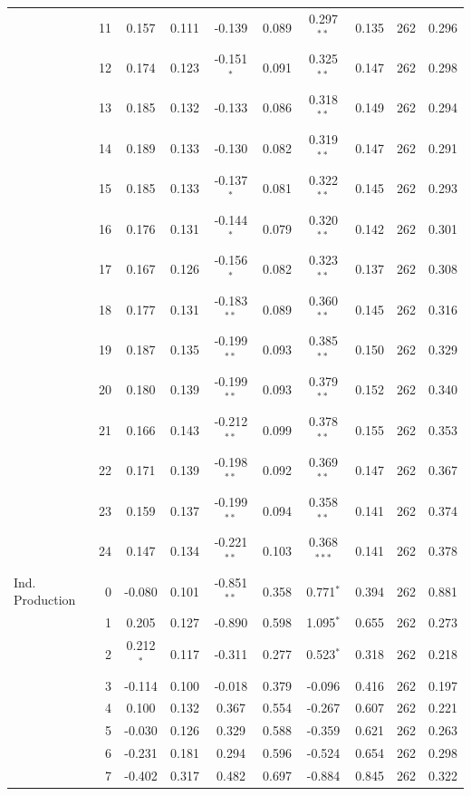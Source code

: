 \begin{longtable}[t]{lrcccccccc}
 & 11 & 0.157 & 0.111 & -0.139 & 0.089 & 0.297$^{**}$ & 0.135 & 262 & 0.296\\
 & 12 & 0.174 & 0.123 & -0.151$^{*}$ & 0.091 & 0.325$^{**}$ & 0.147 & 262 & 0.298\\
 & 13 & 0.185 & 0.132 & -0.133 & 0.086 & 0.318$^{**}$ & 0.149 & 262 & 0.294\\
 & 14 & 0.189 & 0.133 & -0.130 & 0.082 & 0.319$^{**}$ & 0.147 & 262 & 0.291\\
 & 15 & 0.185 & 0.133 & -0.137$^{*}$ & 0.081 & 0.322$^{**}$ & 0.145 & 262 & 0.293\\
 & 16 & 0.176 & 0.131 & -0.144$^{*}$ & 0.079 & 0.320$^{**}$ & 0.142 & 262 & 0.301\\
 & 17 & 0.167 & 0.126 & -0.156$^{*}$ & 0.082 & 0.323$^{**}$ & 0.137 & 262 & 0.308\\
 & 18 & 0.177 & 0.131 & -0.183$^{**}$ & 0.089 & 0.360$^{**}$ & 0.145 & 262 & 0.316\\
 & 19 & 0.187 & 0.135 & -0.199$^{**}$ & 0.093 & 0.385$^{**}$ & 0.150 & 262 & 0.329\\
 & 20 & 0.180 & 0.139 & -0.199$^{**}$ & 0.093 & 0.379$^{**}$ & 0.152 & 262 & 0.340\\
 & 21 & 0.166 & 0.143 & -0.212$^{**}$ & 0.099 & 0.378$^{**}$ & 0.155 & 262 & 0.353\\
 & 22 & 0.171 & 0.139 & -0.198$^{**}$ & 0.092 & 0.369$^{**}$ & 0.147 & 262 & 0.367\\
 & 23 & 0.159 & 0.137 & -0.199$^{**}$ & 0.094 & 0.358$^{**}$ & 0.141 & 262 & 0.374\\
 & 24 & 0.147 & 0.134 & -0.221$^{**}$ & 0.103 & 0.368$^{***}$ & 0.141 & 262 & 0.378\\
\midrule
Ind. Production & 0 & -0.080 & 0.101 & -0.851$^{**}$ & 0.358 & 0.771$^{*}$ & 0.394 & 262 & 0.881\\
 & 1 & 0.205 & 0.127 & -0.890 & 0.598 & 1.095$^{*}$ & 0.655 & 262 & 0.273\\
 & 2 & 0.212$^{*}$ & 0.117 & -0.311 & 0.277 & 0.523$^{*}$ & 0.318 & 262 & 0.218\\
 & 3 & -0.114 & 0.100 & -0.018 & 0.379 & -0.096 & 0.416 & 262 & 0.197\\
 & 4 & 0.100 & 0.132 & 0.367 & 0.554 & -0.267 & 0.607 & 262 & 0.221\\
 & 5 & -0.030 & 0.126 & 0.329 & 0.588 & -0.359 & 0.621 & 262 & 0.263\\
 & 6 & -0.231 & 0.181 & 0.294 & 0.596 & -0.524 & 0.654 & 262 & 0.298\\
 & 7 & -0.402 & 0.317 & 0.482 & 0.697 & -0.884 & 0.845 & 262 & 0.322\\

\end{longtable}
